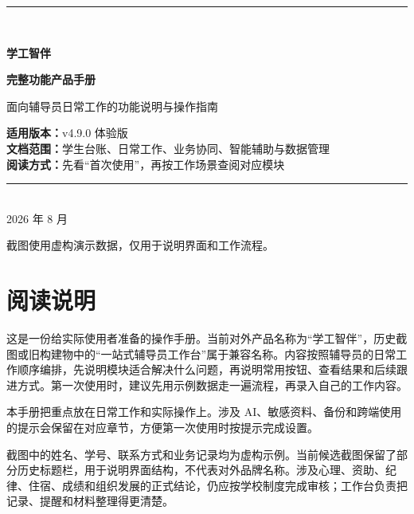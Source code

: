 \documentclass[UTF8,zihao=-4,oneside]{ctexrep}
\newcommand{\productname}{学工智伴}
\newcommand{\version}{v4.9.0 体验版}
\begin{document}
\begin{titlepage}
  \thispagestyle{empty}
  \vspace*{20mm}
  \begin{center}
    {\color{CWBblue}\rule{0.72\textwidth}{1.3pt}}\\[12mm]
    {\Huge\bfseries\color{CWBink} \productname\par}
    \vspace{7mm}
    {\LARGE\bfseries 完整功能产品手册\par}
    \vspace{8mm}
    {\large\color{CWBgray}面向辅导员日常工作的功能说明与操作指南\par}
    \vfill
    \begin{tcolorbox}[width=0.78\textwidth,colback=CWBfill,colframe=CWBline,boxrule=0.5pt,arc=1.5mm]
      \centering
      \large
      \textbf{适用版本：}\version\\[4pt]
      \textbf{文档范围：}学生台账、日常工作、业务协同、智能辅助与数据管理\\[4pt]
      \textbf{阅读方式：}先看“首次使用”，再按工作场景查阅对应模块
    \end{tcolorbox}
    \vfill
    {\color{CWBgray}\rule{0.72\textwidth}{0.4pt}}\\[5mm]
    {\large 2026 年 8 月}\par
    \vspace{4mm}
    {\small\color{CWBgray}截图使用虚构演示数据，仅用于说明界面和工作流程。}
  \end{center}
\end{titlepage}

\chapter*{阅读说明}

这是一份给实际使用者准备的操作手册。当前对外产品名称为“学工智伴”，历史截图或旧构建物中的“一站式辅导员工作台”属于兼容名称。内容按照辅导员的日常工作顺序编排，先说明模块适合解决什么问题，再说明常用按钮、查看结果和后续跟进方式。第一次使用时，建议先用示例数据走一遍流程，再录入自己的工作内容。

\begin{infobox}
本手册把重点放在日常工作和实际操作上。涉及 AI、敏感资料、备份和跨端使用的提示会保留在对应章节，方便第一次使用时按提示完成设置。
\end{infobox}

截图中的姓名、学号、联系方式和业务记录均为虚构示例。当前候选截图保留了部分历史标题栏，用于说明界面结构，不代表对外品牌名称。涉及心理、资助、纪律、住宿、成绩和组织发展的正式结论，仍应按学校制度完成审核；工作台负责把记录、提醒和材料整理得更清楚。
\end{document}
